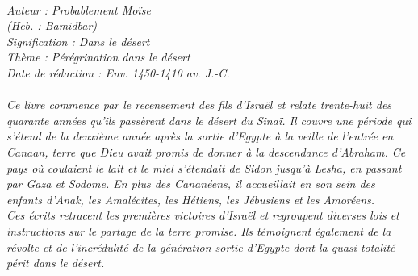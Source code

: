 \BFont
\noindent\hrulefill
{\footnotesize
\textit{
\bigskip
{\centering{}
\\Auteur : Probablement Moïse
\\(Heb. : Bamidbar)
\\Signification : Dans le désert
\\Thème : Pérégrination dans le désert
\\Date de rédaction : Env. 1450-1410 av. J.-C.\\}
}
\textit{
\\Ce livre commence par le recensement des fils d’Israël et relate trente-huit des quarante années qu’ils passèrent dans le désert du Sinaï. Il couvre une période qui s'étend de la deuxième année après la sortie d’Egypte à la veille de l’entrée en Canaan, terre que Dieu avait promis de donner à la descendance d’Abraham. Ce pays où coulaient le lait et le miel s’étendait de Sidon  jusqu’à Lesha, en passant par Gaza et Sodome. En plus des Cananéens, il accueillait en son sein des enfants d’Anak, les Amalécites, les Hétiens, les Jébusiens et les Amoréens.
\\Ces écrits retracent les premières victoires d’Israël et regroupent diverses lois et instructions sur le partage de la terre promise. Ils témoignent également de la révolte et de l’incrédulité de la génération sortie d’Egypte dont la quasi-totalité périt dans le désert.\bigskip
}
}
\par\nobreak\noindent\hrulefill
